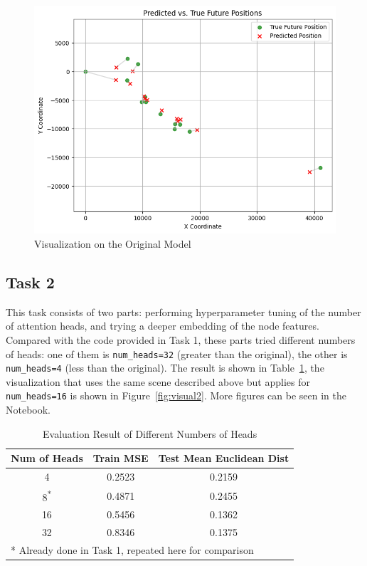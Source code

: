 \documentclass[conference]{IEEEtran}
\begin{document}
\begin{figure}[htbp]
    \centering
    \includegraphics[width=0.8\linewidth]{figvisual1.png}
    \caption{Visualization on the Original Model}
    \label{fig:visual1}
\end{figure}

\subsection*{Task 2}

This task consists of two parts: performing hyperparameter tuning of the number
of attention heads, and trying a deeper embedding of the node features.
Compared with the code provided in Task 1, these parts tried different numbers
of heads: one of them is \texttt{num\_heads=32} (greater than the original), the
other is \texttt{num\_heads=4} (less than the original). The result is shown in
Table~\ref{tab:nh}, the visualization that uses the same scene described above
but applies for \texttt{num\_heads=16} is shown in Figure~\ref{fig:visual2}.
More figures can be seen in the Notebook.

\begin{table}[htbp]
    \caption{Evaluation Result of Different Numbers of Heads}
    \begin{center}
    \begin{tabular}{|c|c|c|}
    \hline
    \textbf{Num of Heads} & \textbf{Train MSE} & \textbf{Test Mean Euclidean Dist} \\
    \hline
    4 & 0.2523 & 0.2159 \\
    \hline
    8\textsuperscript{*} & 0.4871 & 0.2455 \\
    \hline
    16 & 0.5456 & 0.1362 \\
    \hline
    32 & 0.8346 & 0.1375 \\
    \hline

    \multicolumn{3}{l}{* Already done in Task 1, repeated here
        for comparison}
    \end{tabular}
    \label{tab:nh}
    \end{center}
\end{table}
\end{document}
